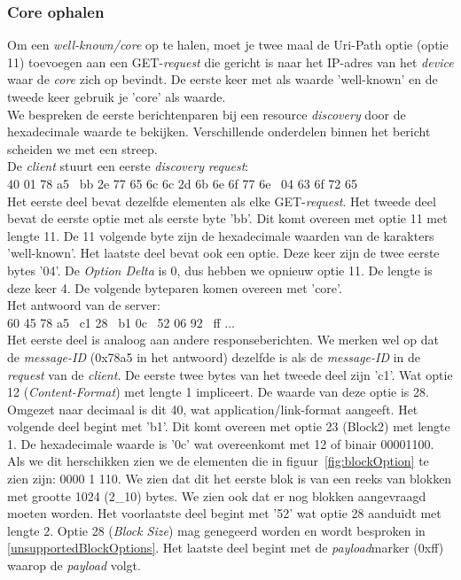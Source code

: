 \subsubsection{Core ophalen}
Om een \textit{well-known/core} op te halen, moet je twee maal de Uri-Path optie (optie 11) toevoegen aan een GET-\textit{request} die gericht is naar het IP-adres van het \textit{device} waar de \textit{core} zich op bevindt. De eerste keer met als waarde 'well-known' en de tweede keer gebruik je 'core' als waarde.\\

\noindent
We bespreken de eerste berichtenparen bij een resource \textit{discovery} door de hexadecimale waarde te bekijken. Verschillende onderdelen binnen het bericht scheiden we met een streep.\\

\noindent
De \textit{client} stuurt een eerste \textit{discovery} \textit{request}:\\
40 01 78 a5 \textbar~bb 2e 77 65 6c 6c 2d 6b 6e 6f 77 6e \textbar~04 63 6f 72 65\\
Het eerste deel bevat dezelfde elementen als elke GET-\textit{request}. Het tweede deel bevat de eerste optie met als eerste byte 'bb'. Dit komt overeen met optie 11 met lengte 11. De 11 volgende byte zijn de hexadecimale waarden van de karakters 'well-known'. Het laatste deel bevat ook een optie. Deze keer zijn de twee eerste bytes '04'. De \textit{Option Delta} is 0, dus hebben we opnieuw optie 11. De lengte is deze keer 4. De volgende byteparen komen overeen met 'core'.\\

\noindent
Het antwoord van de server:\\
60 45 78 a5 \textbar~c1 28 \textbar~b1 0c \textbar~52 06 92 \textbar~ff ...\\
Het eerste deel is analoog aan andere responseberichten. We merken wel op dat de \textit{message-ID} (0x78a5 in het antwoord) dezelfde is als de \textit{message-ID} in de \textit{request} van de \textit{client}. De eerste twee bytes van het tweede deel zijn 'c1'. Wat optie 12 (\textit{Content-Format}) met lengte 1 impliceert. De waarde van deze optie is 28. Omgezet naar decimaal is dit 40, wat application/link-format aangeeft. Het volgende deel begint met 'b1'. Dit komt overeen met optie 23 (Block2) met lengte 1. De hexadecimale waarde is '0c' wat overeenkomt met 12 of binair 00001100. Als we dit herschikken zien we de elementen die in figuur~\ref{fig:blockOption} te zien zijn: 0000 1 110. We zien dat dit het eerste blok is van een reeks van blokken met grootte 1024 (2\_{10}) bytes. We zien ook dat er nog blokken aangevraagd moeten worden. Het voorlaatste deel begint met '52' wat optie 28 aanduidt met lengte 2. Optie 28 (\textit{Block Size}) mag genegeerd worden en wordt besproken in \ref{unsupportedBlockOptions}. Het laatste deel begint met de \textit{payload}marker (0xff) waarop de \textit{payload} volgt.\\

